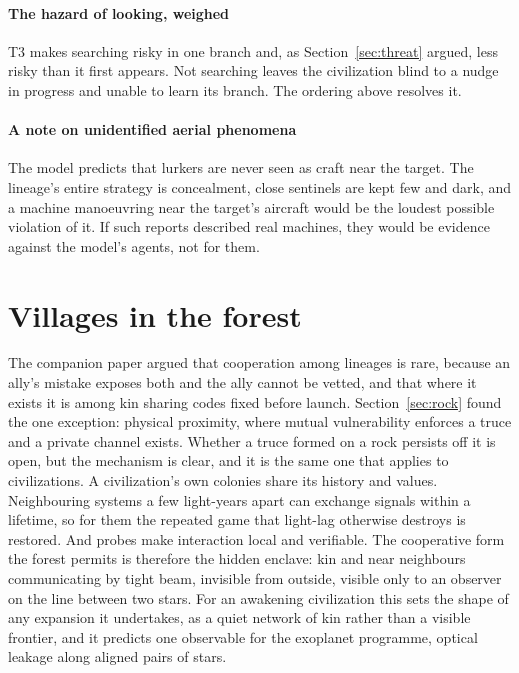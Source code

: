 \documentclass[preprint,12pt]{elsarticle}
\theoremstyle{definition}
\begin{document}
\paragraph{The hazard of looking, weighed} T3 makes searching risky in one branch and, as Section~\ref{sec:threat} argued, less risky than it first appears. Not searching leaves the civilization blind to a nudge in progress and unable to learn its branch. The ordering above resolves it.

\paragraph{A note on unidentified aerial phenomena} The model predicts that lurkers are never seen as craft near the target. The lineage's entire strategy is concealment, close sentinels are kept few and dark, and a machine manoeuvring near the target's aircraft would be the loudest possible violation of it. If such reports described real machines, they would be evidence against the model's agents, not for them.

\section{Villages in the forest}
\label{sec:villages}

The companion paper argued that cooperation among lineages is rare, because an ally's mistake exposes both and the ally cannot be vetted, and that where it exists it is among kin sharing codes fixed before launch. Section~\ref{sec:rock} found the one exception: physical proximity, where mutual vulnerability enforces a truce and a private channel exists. Whether a truce formed on a rock persists off it is open, but the mechanism is clear, and it is the same one that applies to civilizations. A civilization's own colonies share its history and values. Neighbouring systems a few light-years apart can exchange signals within a lifetime, so for them the repeated game that light-lag otherwise destroys is restored. And probes make interaction local and verifiable. The cooperative form the forest permits is therefore the hidden enclave: kin and near neighbours communicating by tight beam, invisible from outside, visible only to an observer on the line between two stars. For an awakening civilization this sets the shape of any expansion it undertakes, as a quiet network of kin rather than a visible frontier, and it predicts one observable for the exoplanet programme, optical leakage along aligned pairs of stars.
\end{document}
